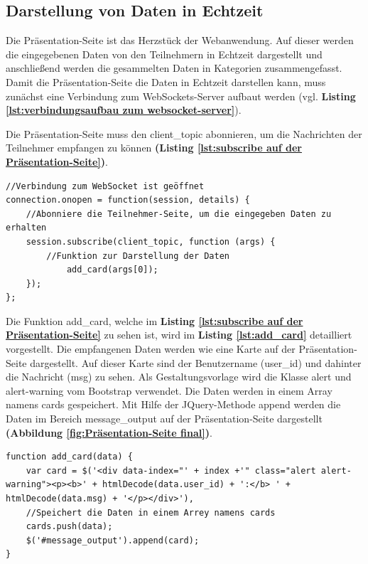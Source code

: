 \subsection{Darstellung von Daten in Echtzeit}
\label{subsce:Darstellung von Daten in Echtzeit}
Die Präsentation-Seite ist das Herzstück der Webanwendung. Auf dieser werden die eingegebenen Daten von den Teilnehmern in Echtzeit dargestellt und anschließend werden die gesammelten Daten in Kategorien zusammengefasst. Damit die Präsentation-Seite die Daten in Echtzeit darstellen kann, muss zunächst eine Verbindung zum WebSockets-Server aufbaut werden (vgl. \textbf{Listing \ref{lst:verbindungsaufbau zum websocket-server}}).\bigskip

Die Präsentation-Seite muss den \glqq client\_topic\grqq{} abonnieren, um die Nachrichten der Teilnehmer empfangen zu können \textbf{(Listing \ref{lst:subscribe auf der Präsentation-Seite})}.\bigskip

\begin{lstlisting}[caption={Subscribe-Muster auf der Präsentation-Seite - JavaScript}, label=lst:subscribe auf der Präsentation-Seite, captionpos=b]
//Verbindung zum WebSocket ist geöffnet
connection.onopen = function(session, details) {
	//Abonniere die Teilnehmer-Seite, um die eingegeben Daten zu erhalten
	session.subscribe(client_topic, function (args) {
		//Funktion zur Darstellung der Daten
    		add_card(args[0]);
	});
};
\end{lstlisting}

Die Funktion \glqq add\_card\grqq{}, welche im \textbf{Listing \ref{lst:subscribe auf der Präsentation-Seite}} zu sehen ist, wird im \textbf{Listing \ref{lst:add_card}} detailliert vorgestellt. Die empfangenen Daten werden wie eine Karte auf der Präsentation-Seite dargestellt. Auf dieser Karte sind der Benutzername (user\_id) und dahinter die Nachricht (msg) zu sehen. Als Gestaltungsvorlage wird die Klasse \glqq alert\grqq{} und \glqq alert-warning\grqq{} vom Bootstrap verwendet. Die Daten werden in einem Array namens \glqq cards\grqq{} gespeichert. Mit Hilfe der JQuery-Methode \glqq append\grqq{} werden die Daten im Bereich \glqq message\_output\grqq{} auf der Präsentation-Seite dargestellt \textbf{(Abbildung \ref{fig:Präsentation-Seite final})}.\bigskip

\begin{lstlisting}[caption={Funktion zur Visualisieren der Daten auf der Präsentation-Seite - JavaScript}, label=lst:add_card, captionpos=b]
function add_card(data) {
	var card = $('<div data-index="' + index +'" class="alert alert-warning"><p><b>' + htmlDecode(data.user_id) + ':</b> ' + htmlDecode(data.msg) + '</p></div>'),
	//Speichert die Daten in einem Arrey namens cards
	cards.push(data);
    $('#message_output').append(card);
}
\end{lstlisting}

